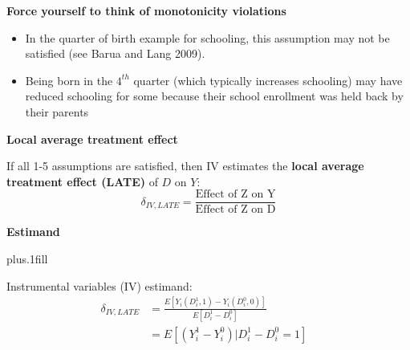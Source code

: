 \documentclass[notes=show]{beamer}
\begin{document}
\begin{frame}[plain]
\begin{center}
\textbf{Force yourself to think of monotonicity violations}
\end{center}

\begin{itemize}
			
\item  In the quarter of birth example for schooling, this assumption may not be satisfied (see Barua and Lang 2009).  
\item Being born in the $4^{th}$ quarter (which typically increases schooling) may have reduced schooling for some because their school enrollment was held back by their parents

\end{itemize}

\end{frame}



\begin{frame}[plain]
	\begin{center}
	\textbf{Local average treatment effect}
	\end{center}

	If all 1-5 assumptions are satisfied, then IV estimates the \textbf{local average treatment effect (LATE)} of $D$ on $Y$: $$\delta_{IV,LATE} =\frac{\text{Effect of Z on Y}}{\text{Effect of Z on D}}$$

\end{frame}	

\begin{frame}[plain]
\begin{center}
\textbf{Estimand}
\end{center}

	\vskip3pt plus.1fill
				
	Instrumental variables (IV) estimand: 
	\begin{align*}
	\delta_{IV,LATE} & = \frac{E[Y_i(D^1_i, 1) - Y_i(D^0_i, 0)]}{E[D^1_i - D^0_i]}& \\
	& = E[(Y^1_i - Y^0_i) | D^1_i - D^0_i = 1]
	\end{align*}

\end{frame}		
\end{document}
